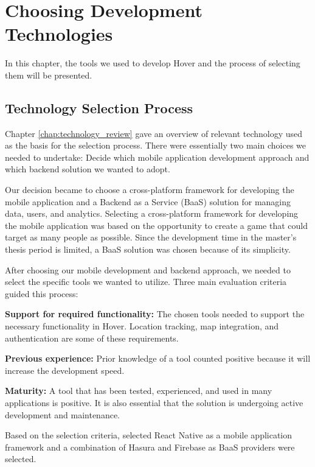 \section{Choosing Development Technologies}
\label{chap:choosing_dev_technologies}
In this chapter, the tools we used to develop Hover and the process of selecting them will be presented.

\subsection{Technology Selection Process}
Chapter \ref{chap:technology_review} gave an overview of relevant technology used as the basis for the selection process. There were essentially two main choices we needed to undertake: Decide which mobile application development approach and which backend solution we wanted to adopt.

Our decision became to choose a cross-platform framework for developing the mobile application and a Backend as a Service (BaaS) solution for managing data, users, and analytics. Selecting a cross-platform framework for developing the mobile application was based on the opportunity to create a game that could target as many people as possible. Since the development time in the master’s thesis period is limited, a BaaS solution was chosen because of its simplicity.

After choosing our mobile development and backend approach, we needed to select the specific tools we wanted to utilize. Three main evaluation criteria guided this process:

\textbf{Support for required functionality:} The chosen tools needed to support the necessary functionality in Hover. Location tracking, map integration, and authentication are some of these requirements.

\textbf{Previous experience:} Prior knowledge of a tool counted positive because it will increase the development speed. 

\textbf{Maturity:} A tool that has been tested, experienced, and used in many applications is positive. It is also essential that the solution is undergoing active development and maintenance.

Based on the selection criteria, selected React Native as a mobile application framework and a combination of Hasura and Firebase as BaaS providers were selected. 

